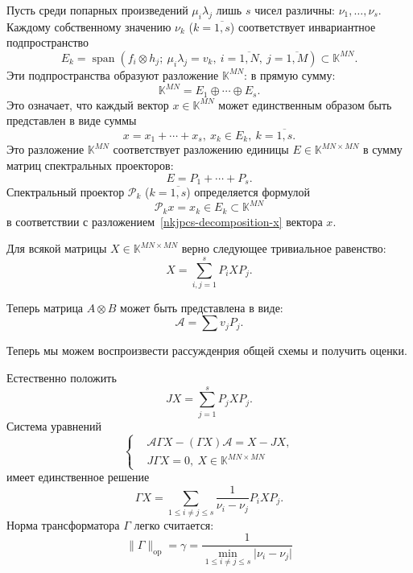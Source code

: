 Пусть среди попарных произведений \( \mu_i \lambda_j \)
    лишь \( s \) чисел различны: \( \nu_1, \ldots, \nu_s \).
Каждому собственному значению \( \nu_k \) (\( k{=}\overline{1,s} \)) соответствует
    инвариантное подпространство
    \[ E_k = \operatorname{span}(f_i\otimes h_j;\ \mu_i\lambda_j = v_k,\ i{=}\overline{1,N},\ j{=}\overline{1,M}) \subset \mathbb{K}^{MN}. \]
Эти подпространства образуют разложение \( \mathbb{K}^{MN} \):
    в прямую сумму:
    \[ \mathbb{K}^{MN} = E_1 \oplus \cdots \oplus E_s. \]
Это означает, что каждый вектор \( x\in\mathbb{K}^{MN} \) может единственным образом
    быть представлен в виде суммы
    \begin{equation}\label{nkjpcs-decomposition-x}
        x = x_1 + \cdots + x_s,\ x_k\in E_k,\ k=\overline{1,s}.
    \end{equation}
Это разложение \( \mathbb{K}^{MN} \)
    соответствует разложению единицы \( E\in \mathbb{K}^{MN{\times}MN} \)
    в сумму матриц спектральных проекторов:
    \[
        E = P_1 + \cdots + P_s.
    \]
Спектральный проектор \( \mathcal{P}_k \) (\(k{=}\overline{1,s}\)) определяется формулой
    \[
        \mathcal{P}_k x = x_k \in E_k\subset \mathbb{K}^{MN}
    \]
    в соответствии с разложением~\eqref{nkjpcs-decomposition-x} вектора \( x \).

Для всякой матрицы \( X\in \mathbb{K}^{MN{\times}MN} \)
    верно следующее тривиальное равенство:
    \[
        X = \sum_{i,j=1}^s P_i X P_j.
    \]

Теперь матрица \( A\otimes B \) может быть представлена в виде:
    \[
        \mathcal{A} = \sum v_j P_j.
    \]

Теперь мы можем воспроизвести рассужденрия общей схемы и получить оценки.

Естественно положить
    \[
        JX = \sum_{j=1}^s P_j X P_j.
    \]
Система уравнений
    \[\left\{\begin{aligned}
        & \mathcal{A}\Gamma X - (\Gamma X) \mathcal{A} = X - JX, \\
        & J\Gamma X = 0,\ X\in \mathbb{K}^{MN{\times}MN}
    \end{aligned}\right.\]
    имеет единственное решение
    \[
        \Gamma X = \sum_{1\leq i{\neq}j \leq s} \frac{1}{\nu_i-\nu_j} P_i X P_j.
    \]
    Норма трансформатора \( \Gamma \) легко считается:
    \[
        \|\Gamma\|_{\mathrm{op}} = \gamma = \frac{1}{\min_{1\leq i{\neq}j\leq s}\lvert\nu_i - \nu_j\rvert}
    \]


